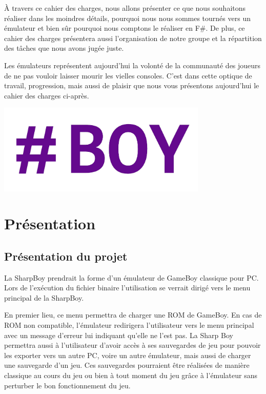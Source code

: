 \documentclass[12pt, a4paper]{article}
\begin{document}
\medskip

À travers ce cahier des charges, nous allons présenter ce que nous souhaitons réaliser dans les moindres détails, pourquoi nous nous sommes tournés vers un émulateur et bien sûr pourquoi nous comptons le réaliser en F\#. De plus, ce cahier des charges présentera aussi l'organisation de notre groupe et la répartition des tâches que nous avons jugée juste.

\medskip

Les émulateurs représentent aujourd'hui la volonté de la communauté des joueurs de ne pas vouloir laisser mourir les vielles consoles. C'est dans cette optique de travail, progression, mais aussi de plaisir que nous vous présentons aujourd'hui le cahier des charges ci-après.
\bigskip
\bigskip
\bigskip
\begin{center}
\includegraphics[width= 10cm]{sharpboylogo.png}
\end{center}
\bigskip
\pagebreak

\section{Présentation}
\subsection{Présentation du projet}
\bigskip
La SharpBoy prendrait la forme d'un émulateur de GameBoy classique pour PC. Lors de l'exécution du fichier binaire l'utilisation se verrait dirigé vers le menu principal de la SharpBoy. 
\medskip

En premier lieu, ce menu permettra de charger une ROM de GameBoy. En cas de ROM non compatible, l'émulateur redirigera l'utilisateur vers le menu principal avec un message d'erreur lui indiquant qu'elle ne l'est pas. La Sharp Boy permettra aussi à l'utilisateur d'avoir accès à ses sauvegardes de jeu pour pouvoir les exporter vers un autre PC, voire un autre émulateur, mais aussi de charger une sauvegarde d'un jeu. Ces sauvegardes pourraient être réalisées de manière classique au cours du jeu ou bien à tout moment du jeu grâce à l'émulateur sans perturber le bon fonctionnement du jeu. 
\medskip
\end{document}
